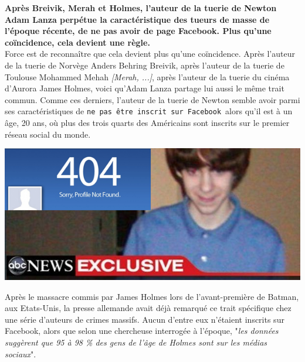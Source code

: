 \documentclass[11pt,twoside,a4paper]{article}
\begin{document}
\textbf{Apr{\`e}s Breivik, Merah et Holmes, l'auteur de la tuerie de Newton Adam Lanza perp{\'e}tue la caract{\'e}ristique des tueurs de masse de l'{\'e}poque r{\'e}cente, de ne pas avoir de page Facebook. Plus qu'une co{\"i}ncidence, cela devient une r{\`e}gle. }~\\

Force est de reconna{\^i}tre que cela devient plus qu'une co{\"i}ncidence. Apr{\`e}s l'auteur de la tuerie de Norv{\`e}ge Anders Behring Breivik, apr{\`e}s l'auteur de la tuerie de Toulouse Mohammed Mehah \emph{[Merah, ...]}, apr{\`e}s l'auteur de la tuerie du cin{\'e}ma d'Aurora James Holmes, voici qu'Adam Lanza partage lui aussi le m{\^e}me trait commun. Comme ces derniers, l'auteur de la tuerie de Newton semble avoir parmi ses caract{\'e}ristiques de \texttt{ne pas {\^e}tre inscrit sur Facebook}~\footnotemark  alors qu'il est {\`a} un {\^a}ge, 20 ans, o{\`u} plus des trois quarts des Am{\'e}ricains sont inscrits sur le premier r{\'e}seau social du monde. ~\\

\begin{minipage}[ht]{0.70\textwidth} 
	\includegraphics[width=1.00\textwidth]{img/facebook-adamlanza.png}
\end{minipage} \hfill \begin{minipage}[ht]{0.28\textwidth} 
	Apr{\`e}s le massacre commis par James Holmes lors de l'avant-premi{\`e}re de Batman, aux Etats-Unis, la presse allemande avait d{\'e}j{\`a} remarqu{\'e} ce trait sp{\'e}cifique chez une s{\'e}rie d'auteurs de crimes massifs. Aucun d'entre eux n'{\'e}taient inscrits sur Facebook, alors que selon une chercheuse interrog{\'e}e {\`a} l'{\'e}poque, "\emph{les donn{\'e}es sugg{\`e}rent que 95 {\`a} 98 \% des gens de l'{\^a}ge de Holmes sont sur les m{\'e}dias sociaux}". ~\\
\end{minipage}
\end{document}
